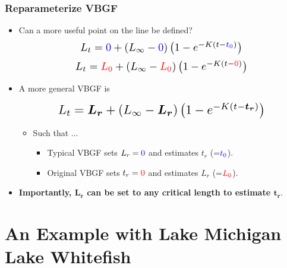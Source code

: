 \documentclass[xcolor=dvipsnames,t]{beamer}\usepackage[]{graphicx}\usepackage[]{color}
\makeatletter
\newcommand*{\Scale}[2][4]{\scalebox{#1}{\ensuremath{#2}}}%
\def\mathcolor#1#{\@mathcolor{#1}}
\def\@mathcolor#1#2#3{%
  \protect\leavevmode
  \begingroup
    \color#1{#2}#3%
  \endgroup
}
\makeatother
\begin{document}
\begin{frame}[fragile]
\frametitle{Reparameterize VBGF}
\vspace{-12pt}
\begin{itemize}
  \item Can a more useful point on the line be defined?
\[\Scale[1.3]{ L_{t} = \mathcolor{blue}{0} + (L_{\infty}-\mathcolor{blue}{0})\left(1-e^{-K(t-\mathcolor{blue}{t_{0}})}\right) }\]
\[\Scale[1.3]{ L_{t} = \mathcolor{red}{L_{0}} + (L_{\infty}-\mathcolor{red}{L_{0}})\left(1-e^{-K(t-\mathcolor{red}{0})}\right) }\]

\pause
\smallskip

  \item A more general VBGF is

\[\Scale[1.5]{ L_{t} = \bm{L_{r}} + (L_{\infty}-\bm{L_{r}})\left(1-e^{-K(t-\bm{t_{r}})}\right) }\]

  \pause
  \begin{itemize}
    \item Such that ...
      \begin{itemize}
        \item Typical VBGF sets $L_{r}=\mathcolor{blue}{0}$ and estimates $t_{r}$ (=$\mathcolor{blue}{t_{0}}$).
        \item Original VBGF sets $t_{r}=\mathcolor{red}{0}$ and estimates $L_{r}$ (=$\mathcolor{red}{L_{0}}$).
      \end{itemize}
    \end{itemize}
    \pause
    \medskip
  \item \textbf{Importantly, $\bm{L_{r}}$ can be set to any critical length to estimate $\bm{t_{r}}$}.
\end{itemize}
\end{frame}



\section{An Example with Lake Michigan Lake Whitefish}
\end{document}
